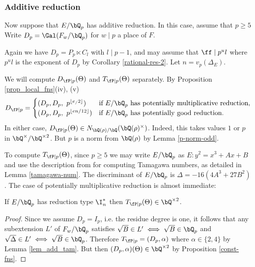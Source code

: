 \subsubsection*{Additive reduction}

Now suppose that $E / \bQ_p$ has additive reduction. In this case, assume that $p \geq 5$
Write $D_p = \Gal(F_w / \bQ_p)$ for $w \mid p$ a place of $F$.

Again we have $D_p = P_p \ltimes C_l$ with $ l \mid p - 1$, and may assume that $\ff \mid p^u l$ where $p^u l $ is the exponent of $D_p$ by Corollary \ref{rational-res-2}. Let $n = v_p(\Delta_E)$. 

We will compute $D_{\fP \mid p}(\Theta)$ and $T_{\fP \mid p}(\Theta)$ separately. 
By Proposition \ref{prop_local_fns}(iv), (v)
\[ D_{\fP \mid p} = 
    \begin{cases}
        (D_p, D_p,\ p^{\floor{e_ /2}}) & \text{if } E / \bQ_p \text{ has potentially multiplicative reduction}, \\
        (D_p, D_p,\ p^{\floor{en /12}}) & \text{if } E / \bQ_p \text { has potentially good reduction}.
    \end{cases}
    \]
In either case, $D_{\fP \mid p}(\Theta) \in N_{\bQ(\rho) / \bQ}(\bQ(\rho)^{\times})$. Indeed, this takes values $1$ or $p$ in $\bQ^{\times} / \bQ^{\times 2}$. But $p$ is a norm from $\bQ(\rho)$ by Lemma \ref{p-norm-odd}.

\vspace{1em}

To compute $T_{\fP \mid p}(\Theta)$, since $p \geq 5$ we may write $E / \bQ_p$ as $E \colon y^2 = x^3 + A x + B$ and use the description from \cite{reg-const} for computing Tamagawa numbers, as detailed in Lemma \ref{tamagawa-num}. The discriminant of $E / \bQ_p$ is $\Delta = -16(4A^3 + 27 B^2)$. The case of potentially multiplicative reduction is almost immediate:

\begin{lemma}
    If $E / \bQ_p$ has reduction type $\I_{n}^{*}$ then $T_{\fP \mid p}(\Theta) \in \bQ^{\times 2}$. 
\end{lemma}

\begin{proof}
Since we assume $D_p = I_p$, i.e. the residue degree is one, it follows that any subextension $L'$ of $F_{w} / \bQ_p$ satisfies $\sqrt{B} \in L' \iff \sqrt{B} \in \bQ_p$ and $\sqrt{\Delta} \in L' \iff \sqrt{B} \in \bQ_p$. 
Therefore $T_{\fP \mid p} = (D_p, \alpha)$ where $\alpha \in \{2, 4\}$ by Lemma \ref{lem_add_tam}. But then $(D_p, \alpha)(\Theta) \in \bQ^{\times 2}$ by Proposition \ref{const-fns}.
\end{proof}

